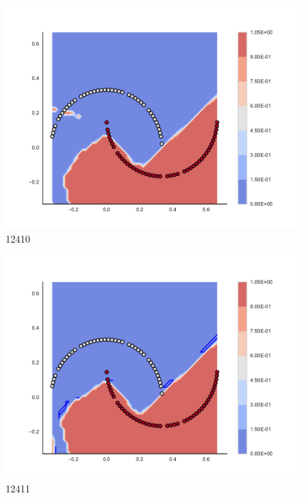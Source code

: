 \begin{subfigure}[b]{0.09\textwidth}
    \includegraphics[clip, trim=2.35cm 1.75cm 4.5cm 0cm,width=\textwidth]{img/convergence/12410.pdf}
    \caption{12410}
    \label{fig:convergence_12410}
\end{subfigure}
%
\begin{subfigure}[b]{0.09\textwidth}
    \includegraphics[clip, trim=2.35cm 1.75cm 4.5cm 0cm,width=\textwidth]{img/convergence/12411.pdf}
    \caption{12411}
    \label{fig:convergence_12411}
\end{subfigure}
%
